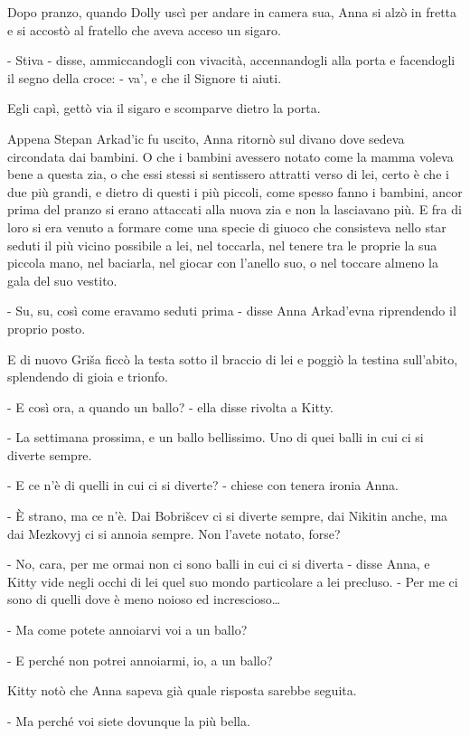 Dopo pranzo, quando Dolly uscì per andare in camera sua, Anna si alzò in fretta e si accostò al fratello che aveva acceso un sigaro. 

- Stiva - disse, ammiccandogli con vivacità, accennandogli alla porta e facendogli il segno della croce: - va', e che il Signore ti aiuti. 

Egli capì, gettò via il sigaro e scomparve dietro la porta. 

Appena Stepan Arkad'ic fu uscito, Anna ritornò sul divano dove sedeva circondata dai bambini. O che i bambini avessero notato come la mamma voleva bene a questa zia, o che essi stessi si sentissero attratti verso di lei, certo è che i due più grandi, e dietro di questi i più piccoli, come spesso fanno i bambini, ancor prima del pranzo si erano attaccati alla nuova zia e non la lasciavano più. E fra di loro si era venuto a formare come una specie di giuoco che consisteva nello star seduti il più vicino possibile a lei, nel toccarla, nel tenere tra le proprie la sua piccola mano, nel baciarla, nel giocar con l'anello suo, o nel toccare almeno la gala del suo vestito. 

- Su, su, così come eravamo seduti prima - disse Anna Arkad'evna riprendendo il proprio posto. 

E di nuovo Griša ficcò la testa sotto il braccio di lei e poggiò la testina sull'abito, splendendo di gioia e trionfo. 

- E così ora, a quando un ballo? - ella disse rivolta a Kitty. 

- La settimana prossima, e un ballo bellissimo. Uno di quei balli in cui ci si diverte sempre. 

- E ce n'è di quelli in cui ci si diverte? - chiese con tenera ironia Anna. 

- È strano, ma ce n'è. Dai Bobrišcev ci si diverte sempre, dai Nikitin anche, ma dai Mezkovyj ci si annoia sempre. Non l'avete notato, forse? 

- No, cara, per me ormai non ci sono balli in cui ci si diverta - disse Anna, e Kitty vide negli occhi di lei quel suo mondo particolare a lei precluso. - Per me ci sono di quelli dove è meno noioso ed increscioso\ldots{} 

- Ma come potete annoiarvi voi a un ballo? 

- E perché non potrei annoiarmi, io, a un ballo? 

Kitty notò che Anna sapeva già quale risposta sarebbe seguita. 

- Ma perché voi siete dovunque la più bella. 

